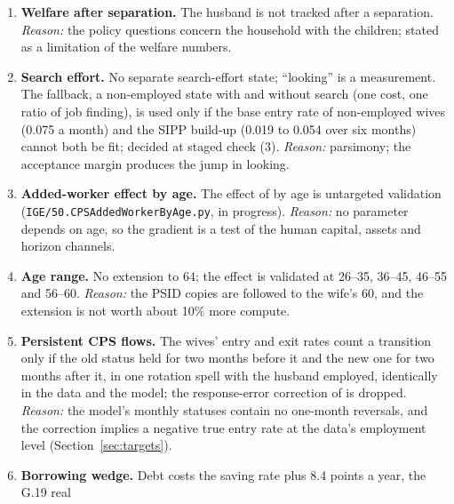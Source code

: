 \documentclass[11pt]{article}
\newcommand{\code}[1]{\texttt{#1}}
\newcommand{\1}{\mathbf{1}}
\begin{document}
\begin{enumerate}[label=\textbf{D\arabic*.}, ref=D\arabic*, leftmargin=*]
  re-employment earnings by spell length are fit by depreciation alone; the wife's lost-hours record in UI. The
  workplace match adds $\pi_c(2)$ (31 in Table~\ref{tab:params}), first on the cut list: merged with $\pi_c(1)$ if the
  Jacobian cannot separate them. \emph{Reason:} every parameter must move a named block of moments. (At the
  estimation size $s = 1, 2$ are merged, so $\pi_c(2)$ does not enter; with $\eta_{up}$ of Decision~\ref{od:eta}, 31
  parameters are free.)
  \item \label{od:welfare} \textbf{Welfare after separation.} The husband is not tracked after a separation.
  \emph{Reason:} the policy questions concern the household with the children; stated as a limitation of the welfare
  numbers.
  \item \label{od:search} \textbf{Search effort.} No separate search-effort state; ``looking'' is a measurement. The
  fallback, a non-employed state with and without search (one cost, one ratio of job finding), is used only if the base
  entry rate of non-employed wives (0.075 a month) and the SIPP build-up (0.019 to 0.054 over six months) cannot both be
  fit; decided at staged check (3). \emph{Reason:} parsimony; the acceptance margin produces the jump in looking.
  \item \label{od:awe} \textbf{Added-worker effect by age.} The effect of \citet{bacher2025joint} by age is untargeted
  validation (\code{IGE/50.CPSAddedWorkerByAge.py}, in progress). \emph{Reason:} no parameter depends on age, so the
  gradient is a test of the human capital, assets and horizon channels.
  \item \label{od:age} \textbf{Age range.} No extension to 64; the effect is validated at 26--35, 36--45, 46--55 and
  56--60. \emph{Reason:} the PSID copies are followed to the wife's 60, and the extension is not worth about 10\% more
  compute.
  \item \label{od:persist} \textbf{Persistent CPS flows.} The wives' entry and exit rates count a transition only if the
  old status held for two months before it and the new one for two months after it, in one rotation spell with the
  husband employed, identically in the data and the model; the response-error correction of
  \citet{poterba1986reporting} is dropped. \emph{Reason:} the model's monthly statuses contain no one-month reversals,
  and the correction implies a negative true entry rate at the data's employment level (Section~\ref{sec:targets}).
  \item \label{od:wedge} \textbf{Borrowing wedge.} Debt costs the saving rate plus 8.4 points a year, the G.19 real

\end{enumerate}
\end{document}
